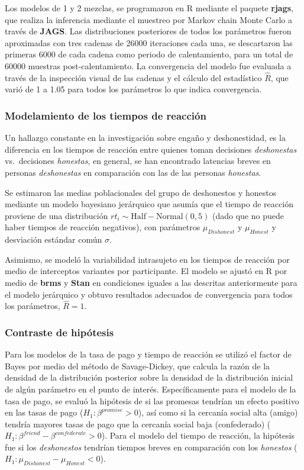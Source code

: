 \documentclass[]{article}
\begin{document}
Los modelos de 1 y 2 mezclas, se programaron en R mediante el paquete
\textbf{rjags}, que realiza la inferencia mediante el muestreo por
Markov chain Monte Carlo a través de \textbf{JAGS}. Las distribuciones
posteriores de todos los parámetros fueron aproximadas con tres cadenas
de 26000 iteraciones cada una, se descartaron las primeras 6000 de cada
cadena como periodo de calentamiento, para un total de 60000 muestras
post-calentamiento. La convergencia del modelo fue evaluada a través de
la inspección visual de las cadenas y el cálculo del estadístico
\(\hat{R}\), que varió de 1 a 1.05 para todos los parámetros lo que
indica convergencia.

\subsubsection{Modelamiento de los tiempos de
reacción}\label{modelamiento-de-los-tiempos-de-reaccion}

Un hallazgo constante en la investigación sobre engaño y deshonestidad,
es la diferencia en los tiempos de reacción entre quienes toman
decisiones \emph{deshonestas} vs.~decisiones \emph{honestas}, en
general, se han encontrado latencias breves en personas
\emph{deshonestas} en comparación con las de las personas
\emph{honestas}.

Se estimaron las medias poblacionales del grupo de deshonestos y
honestos mediante un modelo bayesiano jerárquico que asumía que el
tiempo de reacción proviene de una distribución
\(rt_i \sim \mathrm{Half-Normal}(0, 5)\) (dado que no puede haber
tiempos de reacción negativos), con parámetros \(\mu_{Dishonest}\) y
\(\mu_{Honest}\) y desviación estándar común \(\sigma\).

Asimismo, se modeló la variabilidad intrasujeto en los tiempos de
reacción por medio de interceptos variantes por participante. El modelo
se ajustó en R por medio de \textbf{brms} y \textbf{Stan} en condiciones
iguales a las descritas anteriormente para el modelo jerárquico y obtuvo
resultados adecuados de convergencia para todos los parámetros,
\(\hat{R} = 1\).

\subsubsection{Contraste de hipótesis}\label{contraste-de-hipotesis}

Para los modelos de la tasa de pago y tiempo de reacción se utilizó el
factor de Bayes por medio del método de Savage-Dickey, que calcula la
razón de la densidad de la distribución posterior sobre la densidad de
la distribución inicial de algún parámetro en el punto de interés.
Específicamente para el modelo de la tasa de pago, se evaluó la
hipótesis de si las promesas tendrían un efecto positivo en las tasas de
pago (\(H_1: \beta^{promise} > 0\)), así como si la cercanía social alta
(amigo) tendría mayores tasas de pago que la cercanía social baja
(confederado) (\(H_1: \beta^{friend} - \beta^{confederate} > 0\)). Para
el modelo del tiempo de reacción, la hipótesis fue si los
\emph{deshonestos} tendrían tiempos breves en comparación con los
\emph{honestos} (\(H_1: \mu_{Dishonest} - \mu_{Honest} < 0\)).
\end{document}
